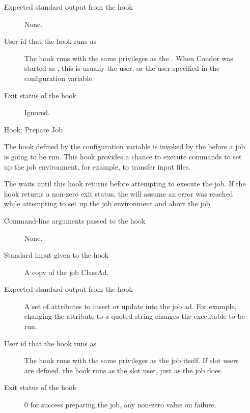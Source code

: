 \begin{itemize}
\begin{description}
\item[Expected standard output from the hook]
  None.

\item[User id that the hook runs as]
  The  hook runs with the same
privileges as the .  When Condor was started as ,
this is usually the  user, or the user specified in
the  configuration variable.

\item[Exit status of the hook]
  Ignored.
\end{description}


\item[Hook: Prepare Job]

The hook defined by the configuration variable
 is invoked by the  before
a job is going to be run.
This hook provides a chance to execute commands to set up the job
environment, for example, to transfer input files.

The  waits until this hook returns before
attempting to execute the job.
If the hook returns a non-zero exit status, the  will
assume an error was reached while attempting to set up the job
environment and abort the job.

\begin{description}
\item[Command-line arguments passed to the hook]
  None.

\item[Standard input given to the hook]
  A copy of the job ClassAd.

\item[Expected standard output from the hook]
  A set of attributes to insert or update into the job ad.  For example,
  changing the  attribute to a quoted string changes the executable 
  to be run.

\item[User id that the hook runs as]
  The  hook runs with the same
privileges as the job itself.  If slot users are defined, the
hook runs as the slot user, just as the job does.

\item[Exit status of the hook]
  0 for success preparing the job, any non-zero value on failure.
\end{description}



\end{itemize}
